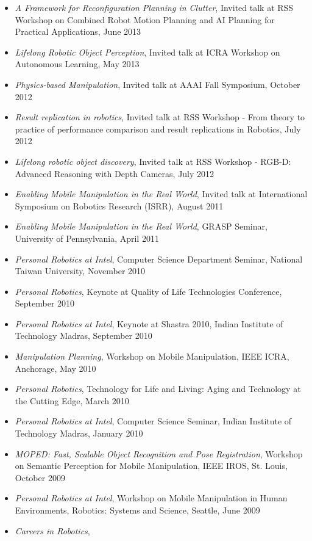 \begin{itemize}
\item \textit{A Framework for Reconfiguration Planning in Clutter},
Invited talk at RSS Workshop on Combined Robot Motion Planning and AI Planning for Practical Applications, June 2013
\item \textit{Lifelong Robotic Object Perception},
Invited talk at ICRA Workshop on Autonomous Learning, May 2013
\item \textit{Physics-based Manipulation},
Invited talk at AAAI Fall Symposium, October 2012
\item \textit{Result replication in robotics},
Invited talk at RSS Workshop - From theory to practice of performance comparison and result replications in Robotics, July 2012
\item \textit{Lifelong robotic object discovery},
Invited talk at RSS Workshop - RGB-D: Advanced Reasoning with Depth Cameras, July 2012
\item \textit{Enabling Mobile Manipulation in the Real World},
Invited talk at International Symposium on Robotics Research (ISRR), August 2011
\item \textit{Enabling Mobile Manipulation in the Real World},
GRASP Seminar, University of Pennsylvania, April 2011
\item \textit{Personal Robotics at Intel},
Computer Science Department Seminar, National Taiwan University, November 2010
\item \textit{Personal Robotics},
Keynote at Quality of Life Technologies Conference, September 2010
\item \textit{Personal Robotics at Intel},
Keynote at Shastra 2010, Indian Institute of Technology Madras, September 2010
\item \textit{Manipulation Planning},
Workshop on Mobile Manipulation, IEEE ICRA, Anchorage, May 2010
\item \textit{Personal Robotics},
Technology for Life and Living: Aging and Technology at the Cutting Edge, March 2010
\item \textit{Personal Robotics at Intel},
Computer Science Seminar, Indian Institute of Technology Madras, January 2010
\item \textit{MOPED: Fast, Scalable Object Recognition and Pose Registration},
Workshop on Semantic Perception for Mobile Manipulation,
IEEE IROS, St. Louis, October 2009
\item \textit{Personal Robotics at Intel},
Workshop on Mobile Manipulation in Human Environments,
Robotics: Systems and Science, Seattle, June 2009
\item \textit{Careers in Robotics},

\end{itemize}
